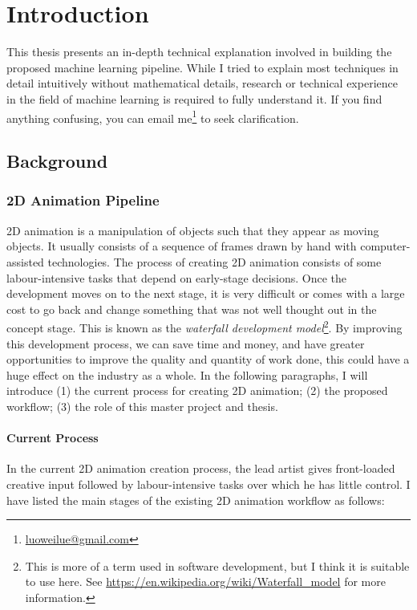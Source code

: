 \chapter{Introduction}
\label{chapterlabel1}

This thesis presents an in-depth technical explanation involved in building the proposed machine learning pipeline. While I tried to explain most techniques in detail intuitively without mathematical details, research or technical experience in the field of machine learning is required to fully understand it. If you find anything confusing, you can email me\footnote{\url{luoweilue@gmail.com}} to seek clarification.

\section{Background}

\subsection{2D Animation Pipeline}
2D animation is a manipulation of objects such that they appear as moving objects. It usually consists of a sequence of frames drawn by hand with computer-assisted technologies. The process of creating 2D animation consists of some labour-intensive tasks that depend on early-stage decisions. Once the development moves on to the next stage, it is very difficult or comes with a large cost to go back and change something that was not well thought out in the concept stage. This is known as the \textit{waterfall development model}\footnote{This is more of a term used in software development, but I think it is suitable to use here. See \url{https://en.wikipedia.org/wiki/Waterfall\_model} for more information.}. By improving this development process, we can save time and money, and have greater opportunities to improve the quality and quantity of work done, this could have a huge effect on the industry as a whole. In the following paragraphs, I will introduce (1) the current process for creating 2D animation;  (2) the proposed workflow; (3) the role of this master project and thesis. 


\subsubsection{Current Process}
In the current 2D animation creation process, the lead artist gives front-loaded creative input followed by labour-intensive tasks over which he has little control. I have listed the main stages of the existing 2D animation workflow as follows:

